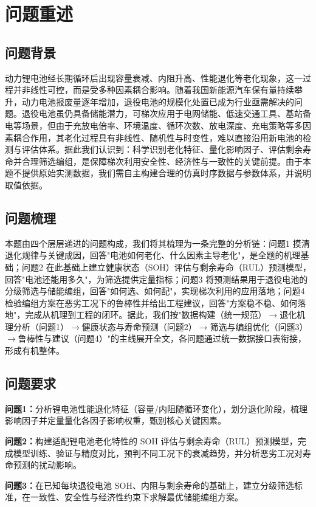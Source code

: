 \documentclass[withoutpreface]{cumcmthesis}
\begin{document}
\section{问题重述}

\subsection{问题背景}
动力锂电池经长期循环后出现容量衰减、内阻升高、性能退化等老化现象，这一过程并非线性可控，而是受多种因素耦合影响。随着我国新能源汽车保有量持续攀升，动力电池报废量逐年增加，退役电池的规模化处置已成为行业亟需解决的问题。退役电池虽仍具备储能潜力，可梯次应用于电网储能、低速交通工具、基站备电等场景，但由于充放电倍率、环境温度、循环次数、放电深度、充电策略等多因素耦合作用，其老化过程具有非线性、随机性与时变性，难以直接沿用新电池的检测与评估体系。据此我们认识到：科学识别老化特征、量化影响因子、评估剩余寿命并合理筛选编组，是保障梯次利用安全性、经济性与一致性的关键前提。由于本题不提供原始实测数据，我们需自主构建合理的仿真时序数据与参数体系，并说明取值依据。

\subsection{问题梳理}
本题由四个层层递进的问题构成，我们将其梳理为一条完整的分析链：问题1 摸清退化规律与关键成因，回答"电池如何老化、什么因素主导老化"，是全题的机理基础；问题2 在此基础上建立健康状态（SOH）评估与剩余寿命（RUL）预测模型，回答"电池还能用多久"，为筛选提供定量指标；问题3 将预测结果用于退役电池的分级筛选与储能编组，回答"如何选、如何配"，实现梯次利用的应用落地；问题4 检验编组方案在恶劣工况下的鲁棒性并给出工程建议，回答"方案稳不稳、如何落地"，完成从机理到工程的闭环。据此，我们按"数据构建（统一规范）$\to$退化机理分析（问题1）$\to$健康状态与寿命预测（问题2）$\to$筛选与编组优化（问题3）$\to$鲁棒性与建议（问题4）"的主线展开全文，各问题通过统一数据接口表衔接，形成有机整体。

\subsection{问题要求}
\textbf{问题1：}分析锂电池性能退化特征（容量/内阻随循环变化），划分退化阶段，梳理影响因子并定量量化各因子影响权重，甄别核心关键因素。

\textbf{问题2：}构建适配锂电池老化特性的 SOH 评估与剩余寿命（RUL）预测模型，完成模型训练、验证与精度对比，预判不同工况下的衰减趋势，并分析恶劣工况对寿命预测的扰动影响。

\textbf{问题3：}在已知每块退役电池 SOH、内阻与剩余寿命的基础上，建立分级筛选标准，在一致性、安全性与经济性约束下求解最优储能编组方案。
\end{document}
